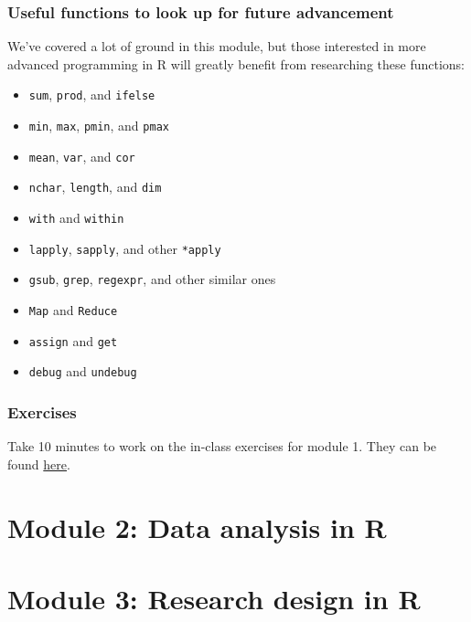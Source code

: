 \documentclass{beamer}
\begin{document}
\begin{frame}
    \frametitle{Useful functions to look up for future advancement}
    We've covered a lot of ground in this module,
    but those interested in more advanced programming in R
    will greatly benefit from researching these functions:\\
    
    \begin{itemize}
      \item \texttt{sum}, \texttt{prod}, and \texttt{ifelse}
      \item \texttt{min}, \texttt{max}, \texttt{pmin}, and \texttt{pmax}
      \item \texttt{mean}, \texttt{var}, and \texttt{cor}
      \item \texttt{nchar}, \texttt{length}, and \texttt{dim}
      \item \texttt{with} and \texttt{within}
      \item \texttt{lapply}, \texttt{sapply}, and other \texttt{*apply}
      \item \texttt{gsub}, \texttt{grep}, \texttt{regexpr}, and other similar ones 
      \item \texttt{Map} and \texttt{Reduce}
      \item \texttt{assign} and \texttt{get}
      \item \texttt{debug} and \texttt{undebug}
    \end{itemize}
\end{frame}


\begin{frame}
    \frametitle{Exercises}
    Take 10 minutes to work on the in-class exercises for module 1.
    They can be found \href{https://github.com/rnitulescu/RcourseOncology2020/exercises1.R}{here}.
\end{frame}



\section{Module 2: Data analysis in R}




\section{Module 3: Research design in R}




\end{document}
